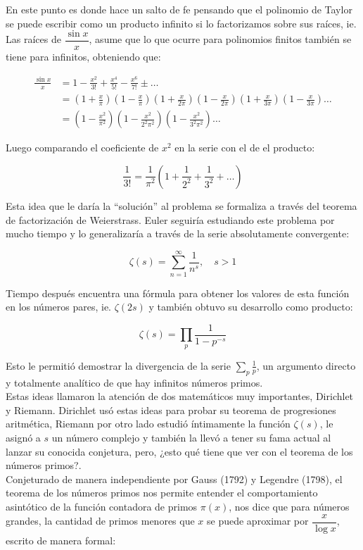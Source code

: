 En este punto es donde hace un salto de fe pensando que el polinomio de Taylor se puede escribir como un producto infinito si lo factorizamos sobre sus raíces, ie. Las  raíces de $\dfrac{\sin x}{x}$, asume que lo que ocurre para polinomios finitos también se tiene para infinitos, obteniendo que:

\begin{align*}
    \frac{\sin x}{x}&=1-\frac{x^2}{3!}+\frac{x^4}{5!}-\frac{x^6}{7!}\pm\ldots\\
    &=\left(1+\frac{x}{\pi}\right)\left(1-\frac{x}{\pi}\right)\left(1+\frac{x}{2\pi}\right)\left(1-\frac{x}{2\pi}\right)\left(1+\frac{x}{3\pi}\right)\left(1-\frac{x}{3\pi}\right)\ldots\\
&=\left(1-\frac{x^2}{\pi^2}\right)\left(1-\frac{x^2}{2^2\pi^2}\right)\left(1-\frac{x^2}{3^2\pi^2}\right)\ldots
\end{align*}

Luego comparando el coeficiente de $x^2$ en la serie con el de el producto:

$$\frac{1}{3!}=\frac{1}{\pi^2}\left(1+\frac{1}{2^2}+\frac{1}{3^2}+\ldots\right)$$

Esta idea que le daría la ``solución'' al problema se formaliza a través del teorema de factorización de Weierstrass. Euler seguiría estudiando este problema por mucho tiempo y lo generalizaría a través de la serie absolutamente convergente:

$$\zeta(s)=\sum_{n=1}^{\infty}\frac{1}{n^s}, \quad s>1$$

Tiempo después encuentra una fórmula para obtener los valores de esta función en los números pares, ie. $\zeta(2s)$ y también obtuvo su desarrollo como producto:

$$\zeta(s)=\prod_{p}\frac{1}{1-p^{-s}}$$

Esto le permitió demostrar la divergencia de la serie $\displaystyle \sum_p\frac{1}{p}$, un argumento directo y totalmente analítico de que hay infinitos números primos.\\

Estas ideas llamaron la atención de dos matemáticos muy importantes, Dirichlet y Riemann. Dirichlet usó estas ideas para probar su teorema de progresiones aritmética, Riemann por otro lado estudió íntimamente la función $\zeta(s)$, le asignó a $s$ un número complejo y también la llevó a tener su fama actual al lanzar su conocida conjetura, pero, ¿esto qué tiene que ver con el teorema de los números primos?.\\

Conjeturado de manera independiente por Gauss (1792) y Legendre (1798), el teorema de los números primos nos permite entender el comportamiento asintótico de la función contadora de  primos $\pi(x)$, nos dice  que para números grandes, la cantidad de primos menores que $x$ se puede aproximar por $\dfrac{x}{\log x}$, escrito de manera formal:

